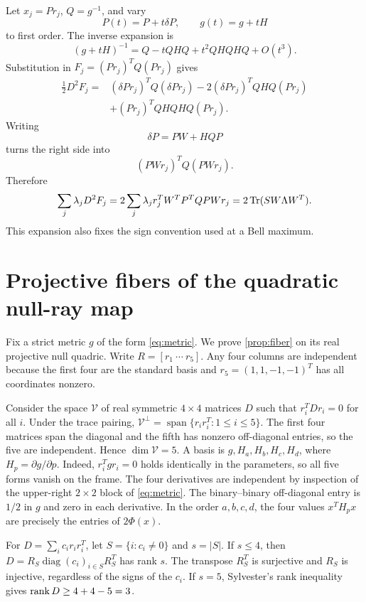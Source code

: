 Let \(x_j=Pr_j\), \(Q=g^{-1}\), and vary
\[
P(t)=P+t\delta P,\qquad g(t)=g+tH
\]
to first order. The inverse expansion is
\[
(g+tH)^{-1}
=Q-tQHQ+t^2QHQHQ+O(t^3).
\]
Substitution in \(F_j=(P r_j)^TQ(P r_j)\) gives
\[
\begin{aligned}
\frac12D^2F_j
={}&(\delta P r_j)^TQ(\delta P r_j)
-2(\delta P r_j)^TQHQ(Pr_j)\\
&+(Pr_j)^TQHQHQ(Pr_j).
\end{aligned}
\]
Writing
\[
\delta P=PW+HQ P
\]
turns the right side into
\[
(PWr_j)^TQ(PWr_j).
\]
Therefore
\[
\sum_j\lambda_jD^2F_j
=2\sum_j\lambda_jr_j^TW^TP^TQPW r_j
=2\operatorname{Tr}(SW\Lambda W^T).
\]
This expansion also fixes the sign convention used at a Bell maximum.

\section{Projective fibers of the quadratic null-ray map}
\label{app:fibers}

Fix a strict metric \(g\) of the form \eqref{eq:metric}. We prove
\cref{prop:fiber} on its real projective null quadric. Write
\(R=[r_1\ \cdots\ r_5]\). Any four columns are independent because
the first four are the standard basis and \(r_5=(1,1,-1,-1)^T\)
has all coordinates nonzero.

Consider the space \(\mathcal V\) of real symmetric \(4\times4\)
matrices \(D\) such that \(r_i^TDr_i=0\) for all \(i\). Under the trace
pairing, \(\mathcal V^\perp=\operatorname{span}\{r_i r_i^T:1\le i\le5\}\).
The first four matrices span the diagonal and the fifth has nonzero
off-diagonal entries, so the five are independent. Hence \(\dim\mathcal V=5\).
A basis is \(g,H_a,H_b,H_c,H_d\), where \(H_p=\partial g/\partial p\).
Indeed, \(r_i^Tg r_i=0\) holds identically in the parameters, so all five
forms vanish on the frame. The four derivatives are independent by
inspection of the upper-right \(2\times2\) block of \eqref{eq:metric}.
The binary--binary off-diagonal entry is \(1/2\) in \(g\) and zero in
each derivative. In the order \(a,b,c,d\), the four values \(x^T H_p x\)
are precisely the entries of \(2\Phi(x)\).

For \(D=\sum_i c_i r_i r_i^T\), let \(S=\{i:c_i\ne0\}\) and \(s=|S|\).
If \(s\le4\), then \(D=R_S\operatorname{diag}(c_i)_{i\in S}R_S^T\)
has rank \(s\). The transpose \(R_S^T\) is surjective and \(R_S\) is
injective, regardless of the signs of the \(c_i\). If \(s=5\),
Sylvester's rank inequality gives \(\operatorname{rank} D\ge4+4-5=3\).

